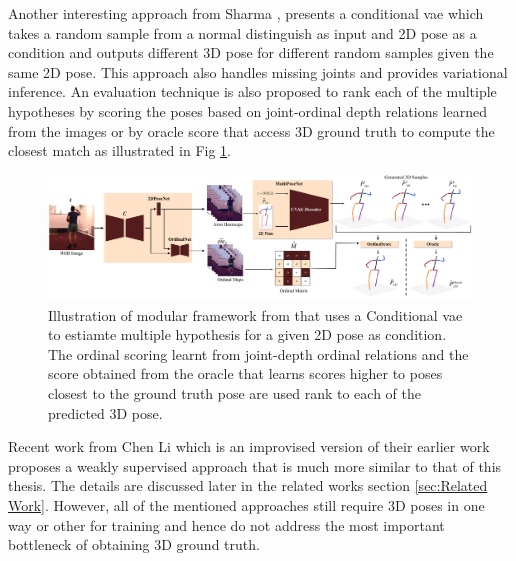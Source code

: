 Another interesting approach from Sharma \etal \cite{ordinalranking}, presents a conditional \acl{vae} which takes a random sample from a normal distinguish as input and 2D pose as a condition and outputs different 3D pose for different random samples given the same 2D pose. This approach also handles missing joints and provides variational inference. An evaluation technique is also proposed to rank each of the multiple hypotheses by scoring the poses based on joint-ordinal depth relations learned from the images or by oracle score that access 3D ground truth to compute the closest match as illustrated in Fig \ref{fig:ordinal_arch}.

\begin{figure}[h]
    \centering
    \includegraphics[width=\linewidth]{figures/background/ordinal_arch.pdf}
    \caption{Illustration of modular framework from \cite{ordinalranking} that uses a Conditional \ac{vae} to estiamte multiple hypothesis for a given 2D pose as condition. The ordinal scoring learnt from joint-depth ordinal relations and the score obtained from the oracle that learns scores higher to poses closest to the ground truth pose are used rank to each of the predicted 3D pose.}
    \label{fig:ordinal_arch}
\end{figure}

Recent work from Chen Li \etal \cite{weaklymultiple} which is an improvised version of their earlier work \cite{multiplehypo} proposes a weakly supervised approach that is much more similar to that of this thesis. The details are discussed later in the related works section \ref{sec:Related Work}. However, all of the mentioned approaches still require 3D poses in one way or other for training and hence do not address the most important bottleneck of obtaining 3D ground truth. 

